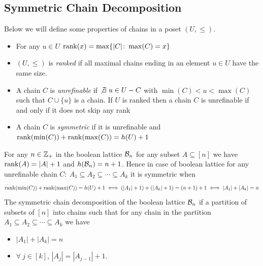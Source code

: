 \documentclass[twoside]{article}
\begin{document}
\subsection{Symmetric Chain Decomposition}
Below we will define some properties of chains in a poset $(U,\leq)$.\begin{itemize}[label=$\bullet$]
	\item For any $u\in U$ $\operatorname{rank}(x)=\max\limits\{|C|\colon \max(C)=x\}$
	\item $(U,\leq)$ is \textit{ranked} if  all maximal chains ending in an element $u\in U$ have the same size.
	\item A chain $C$ is \textit{unrefinable} if $\not\exists\ u\in U-C$ with $\min(C)<u<\max(C)$ such that $C\cup \{u\}$ is a chain. If $U$ is ranked then a chain $C$ is unrefinable if and only if it does not skip any rank
	\item A chain $C$ is \textit{symmetric} if it is unrefinable and $\operatorname{rank}(\min(C))+\operatorname{rank}(\max(C))=h(U)+1$
\end{itemize}

For any $n\in \mathbb{Z}_+$  in the boolean lattice $\mathcal{B}_n$ for any subset $A\subseteq [n]$ we have $\operatorname{rank}(A)=|A|+1$ and $h(\mathcal{B}_n)=n+1$. Hence in case of boolean lattice for any unrefinable chain $C:\ A_1\subseteq A_2\subseteq \cdots\subseteq A_k$ it is symmetric when $$\operatorname{rank}(\min(C))+\operatorname{rank}(\max(C))=h(U)+1\iff (|A_1|+1)+(|A_k|+1)=(n+1)+1\iff |A_1|+|A_k|=n$$The symmetric chain decomposition of the boolean lattice $\mathcal{B}_n$ if a partition of subsets of $[n]$ into chains such that for any chain in the partition $A_1\subseteq A_2\subseteq\cdots \subseteq A_k$ we have \begin{itemize}[label=$\bullet$]
	\item $|A_1|+|A_k|=n$
	\item $\forall\ j\in[k]$, $|A_j|=|A_{j-1}|+1$.
\end{itemize}

\vspace*{5mm}
\end{document}
